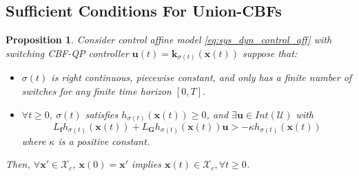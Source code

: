 \documentclass[letterpaper, 10 pt, conference]{ieeeconf}  %
\newtheorem{proposition}{Proposition}
\begin{document}
\subsection{Sufficient Conditions For Union-CBFs}
\label{sec:general_sufficient_condition}
\begin{proposition}
\label{prop:fi_switch_control}
    Consider control affine model \eqref{eq:sys_dyn_control_aff} with switching CBF-QP controller $\mathbf{u}(t) = \mathbf{k}_{\sigma(t)}(\mathbf{x}(t))$ suppose that:
    {
    \begin{itemize}
        \item[\textbf{P1-1}] $\sigma(t)$ is right continuous, piecewise constant, and only has a finite number of switches for any finite time horizon $[0, T]$.
        \item[\textbf{P1-2}] $\forall t\geq 0$, $\sigma(t)$ satisfies $h_{\sigma(t)}(\mathbf{x}(t))\geq 0$, and $\exists \mathbf{u} \in Int(\mathcal{U})$ with 
        \begin{equation}
        \label{eq:strict_safety}
              L_{\mathbf{f}}h_{\sigma(t)}(\mathbf{x}(t)) + L_{\mathbf{G}}h_{\sigma(t)}(\mathbf{x}(t))\mathbf{u}>-\kappa h_{\sigma(t)}(\mathbf{x}(t))
        \end{equation}
        where $\kappa$ is a positive constant.
    \end{itemize}
    }
    Then, $\forall \mathbf{x}'\in\mathcal{X}_c$, $\mathbf{x}(0) = \mathbf{x}'$ implies $\mathbf{x}(t)\in\mathcal{X}_c, \forall t\geq 0$.
\end{proposition}
\end{document}
